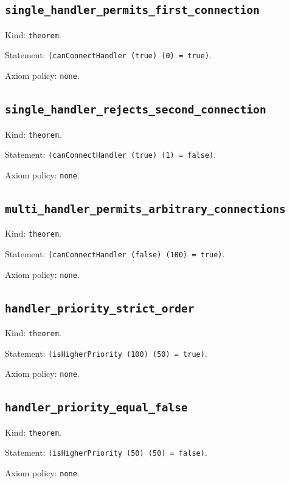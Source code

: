 \documentclass[11pt]{article}
\begin{document}
\subsection*{\texttt{single\_handler\_permits\_first\_connection}}
\noindent Kind: \texttt{theorem}.\par
\noindent Statement: \texttt{(canConnectHandler (true) (0) = true)}.\par
\noindent Axiom policy: \texttt{none}.\par
\subsection*{\texttt{single\_handler\_rejects\_second\_connection}}
\noindent Kind: \texttt{theorem}.\par
\noindent Statement: \texttt{(canConnectHandler (true) (1) = false)}.\par
\noindent Axiom policy: \texttt{none}.\par
\subsection*{\texttt{multi\_handler\_permits\_arbitrary\_connections}}
\noindent Kind: \texttt{theorem}.\par
\noindent Statement: \texttt{(canConnectHandler (false) (100) = true)}.\par
\noindent Axiom policy: \texttt{none}.\par
\subsection*{\texttt{handler\_priority\_strict\_order}}
\noindent Kind: \texttt{theorem}.\par
\noindent Statement: \texttt{(isHigherPriority (100) (50) = true)}.\par
\noindent Axiom policy: \texttt{none}.\par
\subsection*{\texttt{handler\_priority\_equal\_false}}
\noindent Kind: \texttt{theorem}.\par
\noindent Statement: \texttt{(isHigherPriority (50) (50) = false)}.\par
\noindent Axiom policy: \texttt{none}.\par
\end{document}

